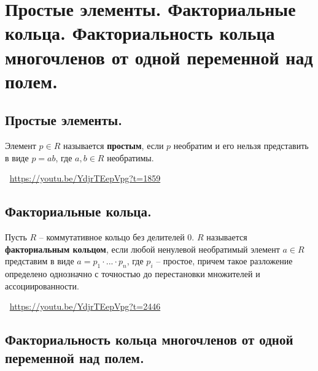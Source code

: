 \section{Простые элементы. Факториальные кольца. Факториальность кольца многочленов от одной переменной над полем.}

\subsection{Простые элементы.}
\begin{definition}
    Элемент $p \in R$ называется \textbf{простым}, если $p$ необратим и его нельзя представить в виде $p = ab$, где $a, b \in R$ необратимы.
\end{definition}
\large \faYoutube \normalsize $\>$ \url{https://youtu.be/YdjrTEepVpg?t=1859}

\subsection{Факториальные кольца.}
\begin{definition}
    Пусть $R$ -- коммутативное кольцо без делителей 0. $R$ называется \textbf{факториальным кольцом}, если любой ненулевой необратимый элемент $a \in R$ представим в виде $a = p_1 \cdot ... \cdot p_n$, где $p_i$ -- простое, причем такое разложение определено однозначно с точностью до перестановки множителей и ассоциированности.
\end{definition}
\large \faYoutube \normalsize $\>$ \url{https://youtu.be/YdjrTEepVpg?t=2446}

\subsection{Факториальность кольца многочленов от одной переменной над полем.}
        
